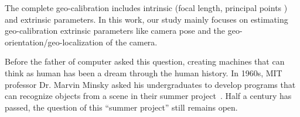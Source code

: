 The complete geo-calibration includes intrinsic (focal
length, principal points \etc) and extrinsic parameters.
In this work, our study mainly focuses on estimating geo-calibration
extrinsic parameters like camera pose and the
geo-orientation/geo-localization of the camera.







Before the father of computer asked this question, creating
machines that can think as human has been a dream through the human
history. In 1960s, MIT professor Dr. Marvin Minsky asked his
undergraduates to develop programs that can recognize objects from a
scene in their summer project~\cite{boden2006mind}. Half a century has
passed, the question of this ``summer project'' still remains open.


